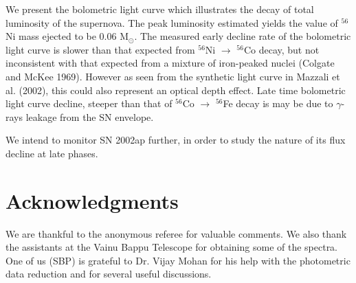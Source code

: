 We present the bolometric light curve which illustrates the decay of total 
luminosity of the supernova. The peak luminosity estimated yields the value
of $^{56}$Ni mass ejected to be 0.06 M${_\odot}$. 
The measured early decline rate of the bolometric light curve is slower than 
that expected from ${}^{56}$Ni $\rightarrow$ ${}^{56}$Co decay, but not inconsistent
with that expected from a mixture of iron-peaked nuclei 
(Colgate and McKee 1969). However as seen from the synthetic light curve in
Mazzali et al. (2002), this could also represent an optical depth effect.
 Late time bolometric light curve decline, steeper than that of ${}^{56}$Co $\rightarrow$ ${}^{56}$Fe
 decay is may be due to $\gamma$-rays leakage from the SN envelope.

We intend to monitor SN 2002ap further, in order to study the nature of 
its flux decline at late phases.

\section*{Acknowledgments}
We are thankful to the anonymous referee for valuable comments.      
We also thank the assistants at the Vainu Bappu Telescope for obtaining some of
the spectra. One of us (SBP) is grateful to Dr. Vijay Mohan for his help with
the photometric data reduction and for several useful discussions.
        
